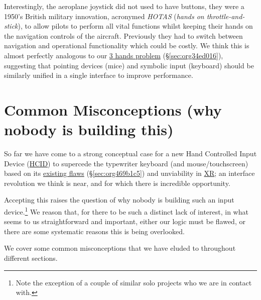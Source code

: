 \documentclass[logo,bsc,singlespacing,parskip]{infthesis}
\begin{document}
Interestingly, the aeroplane joystick did not used to have buttons, they were a 1950's British military innovation, acronymed \emph{HOTAS} (\emph{hands on throttle-and-stick}), to allow pilots to perform all vital functions whilst keeping their hands on the navigation controls of the aircraft.
Previously they had to switch between navigation and operational functionality which could be costly.
We think this is almost perfectly analogous to our \hyperref[sec:org34ed016]{3 hands problem} (\S \ref{sec:org34ed016}), suggesting that pointing devices (mice) and symbolic input (keyboard) should be similarly unified in a single interface to improve performance.
\chapter{Common Misconceptions (why nobody is building this)}
\label{sec:orga317a7c}
So far we have come to a strong conceptual case for a new Hand Controlled Input Device (\hyperref[org917851e]{HCID}) to supercede the typewriter keyboard (and mouse/touchscreen) based on its \hyperref[sec:org469b1c5]{existing flaws} (\S \ref{sec:org469b1c5}) and unviability in \hyperref[org53dbe83]{XR}; an interface revolution we think is near, and for which there is incredible opportunity.

Accepting this raises the question of why nobody is building such an input device.\footnote{Note the exception of a couple of similar solo projects \autocites{plattelWanderingComputer}[][]{Typewarea} who we are in contact with.}
We reason that, for there to be such a distinct lack of interest, in what seems to us straightforward and important, either our logic must be flawed, or there are some systematic reasons this is being overlooked.

We cover some common misconceptions that we have eluded to throughout different sections.
\end{document}
